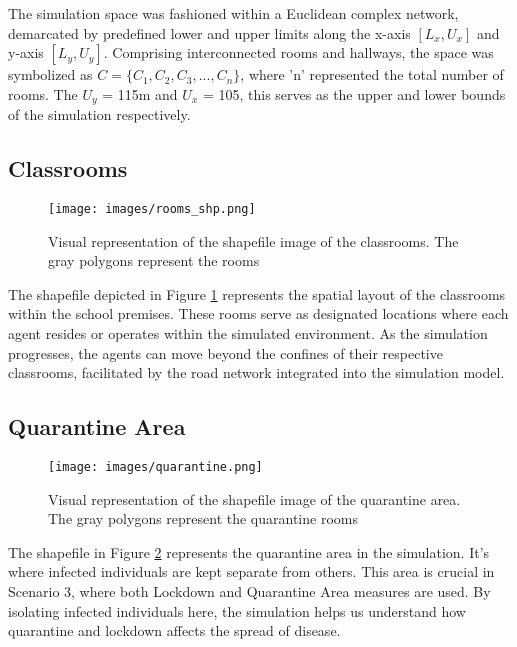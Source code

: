  The simulation space was fashioned within a Euclidean complex network, demarcated by predefined lower and upper limits along the x-axis $[L_x, U_x]$ and y-axis $[L_y, U_y]$. Comprising interconnected rooms and hallways, the space was symbolized as $C = \{C_1, C_2, C_3, ..., C_n\}$, where 'n' represented the total number of rooms. The $U_y$ = 115m and $U_x$ = 105, this serves as the upper and lower bounds of the simulation respectively.\\
 
\subsection{Classrooms}
 
 \begin{figure}[H]
 	\centering
 	\texttt{[image: images/rooms\_shp.png]}
 	\caption{Visual representation of the shapefile image of the classrooms. The gray polygons represent the rooms}
 	\label{rooms_shp}
 \end{figure}   
 
 The shapefile depicted in Figure \ref{rooms_shp} represents the spatial layout of the classrooms within the school premises. These rooms serve as designated locations where each agent resides or operates within the simulated environment. As the simulation progresses, the agents can move beyond the confines of their respective classrooms, facilitated by the  road network integrated into the simulation model.
 
 \subsection{Quarantine Area}
 \begin{figure}[H]
 	\centering
 	\texttt{[image: images/quarantine.png]}
 	\caption{Visual representation of the shapefile image of the quarantine area. The gray polygons represent the quarantine rooms}
 	\label{qua}
 	
 \end{figure}   
 
 The shapefile in Figure \ref{qua} represents the quarantine area in the simulation. It's where infected individuals are kept separate from others. This area is crucial in Scenario 3, where both Lockdown and Quarantine Area measures are used. By isolating infected individuals here, the simulation helps us understand how quarantine and lockdown affects the spread of disease.
 
